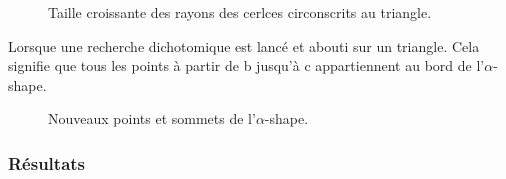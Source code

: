\begin{figure}[h!]
  \centering
  \caption{Taille croissante des rayons des cerlces circonscrits au triangle.}
\end{figure}

Lorsque une recherche dichotomique est lancé et abouti sur un triangle. Cela signifie que tous les points à partir de b jusqu'à c appartiennent au bord de l'$\alpha$-shape.

\begin{figure}[h!]
  \centering
  \caption{Nouveaux points et sommets de l'$\alpha$-shape.}
\end{figure}

\subsubsection{Résultats}

